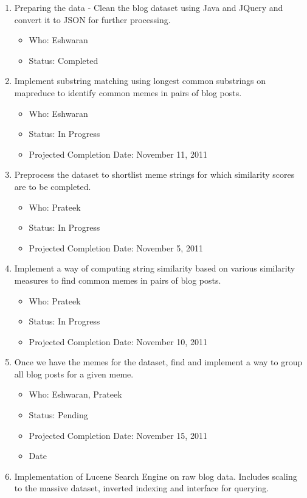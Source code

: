 \documentclass{acm_proc_article-sp}
\begin{document}
\begin{enumerate}
  \item Preparing the data - Clean the blog dataset using Java and JQuery and convert it to JSON for further processing.	\begin{itemize}
	\item Who: Eshwaran
	\item Status: Completed
	\end{itemize}
  \item Implement substring matching using longest common substrings on mapreduce to identify common memes in pairs of blog posts. \begin{itemize}
	\item Who: Eshwaran
	\item Status: In Progress
	\item Projected Completion Date: November 11, 2011
	\end{itemize}
  \item Preprocess the dataset to shortlist meme strings for which similarity scores are to be completed.\begin{itemize}
	\item Who: Prateek
	\item Status: In Progress
	\item Projected Completion Date: November 5, 2011
	\end{itemize}
  \item Implement a way of computing string similarity based on various similarity measures to find common memes in pairs of blog posts.\begin{itemize}
	\item Who: Prateek
	\item Status: In Progress
	\item Projected Completion Date: November 10, 2011
	\end{itemize}
  \item Once we have the memes for the dataset, find and implement a way to group all blog posts for a given meme.\begin{itemize}
	\item Who: Eshwaran, Prateek
	\item Status: Pending
	\item Projected Completion Date: November 15, 2011
	\item Date
	\end{itemize}
  \item Implementation of Lucene Search Engine on raw blog data. Includes scaling to the massive dataset, inverted indexing and interface for querying.\begin{itemize}

\end{itemize}
\end{enumerate}
\end{document}
